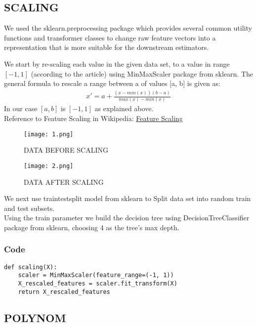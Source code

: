 \documentclass{article}
\begin{document}
\subsection{SCALING}
We used the sklearn.preprocessing package which provides several common utility functions and transformer classes to change raw feature vectors into a representation that is more suitable for the downstream estimators.\\
\par
We start by re-scaling each value in the given data set, to a value in range \([-1,1]\) (according to the article) using MinMaxScaler package from sklearn.
The general formula to rescale a range between a of values [a, b] is given as:
\begin{equation}
\begin{split}
x' = a + \frac{(x-min(x))(b-a)}{max(x)-min(x)} 
\end{split}
\end{equation}
In our case \([a,b]\) is \([-1,1]\) as explained above.\\
Reference to Feature Scaling in Wikipedia: \href{https://en.wikipedia.org/wiki/Feature_scaling}{Feature Scaling}

\par

\begin{figure}[H]
\caption{DATA BEFORE SCALING }
\texttt{[image: 1.png]}
\label{fig:label}
\end{figure} 

\begin{figure}[H]
\caption{DATA AFTER SCALING }
\texttt{[image: 2.png]}
\label{fig:label}
\end{figure} 


We next use train\textunderscore test\textunderscore split model from sklearn to Split data set into random train and test subsets.\\ 
Using the train parameter we build the decision tree using DecisionTreeClassifier package from sklearn, choosing 4 as the tree's max depth. 
\subsubsection{Code}
\begin{lstlisting}
def scaling(X):
    scaler = MinMaxScaler(feature_range=(-1, 1))
    X_rescaled_features = scaler.fit_transform(X)
    return X_rescaled_features
\end{lstlisting}
\subsection{POLYNOM}
\end{document}
